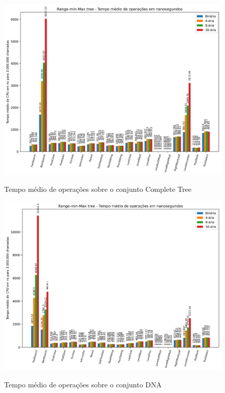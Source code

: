 \begin{figure}[!ht]
    \centering
      \caption[Operações sobre o conjunto de dado ctree]{Tempo médio de operações sobre o conjunto Complete Tree}{
          \includegraphics[scale=0.8, angle=90]{images/ctree_i3000000.png}
        }
\end{figure}

\begin{figure}[!ht]
    \centering
      \caption[Operações sobre o conjunto de dado dna]{Tempo médio de operações sobre o conjunto DNA}{
          \includegraphics[scale=0.8, angle=90]{images/dna_i3000000.png}
        }
\end{figure}

